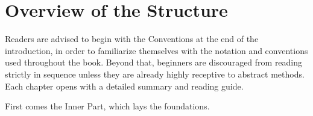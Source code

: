
\section*{Overview of the Structure}
\hypertarget{o014.aljabr2.prelude.structure-overview}{ }

Readers are advised to begin with the Conventions at the end of the introduction, in order to familiarize themselves with the notation and conventions used throughout the book. Beyond that, beginners are discouraged from reading strictly in sequence unless they are already highly receptive to abstract methods. Each chapter opens with a detailed summary and reading guide.

First comes the Inner Part, which lays the foundations.

